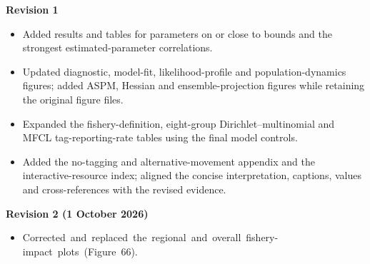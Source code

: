 \textbf{Revision 1}

\begin{itemize}
  \item Added results and tables for parameters on or close to bounds and the strongest estimated-parameter correlations.
  \item Updated diagnostic, model-fit, likelihood-profile and population-dynamics figures; added ASPM, Hessian and ensemble-projection figures while retaining the original figure files.
  \item Expanded the fishery-definition, eight-group Dirichlet--multinomial and MFCL tag-reporting-rate tables using the final model controls.
  \item Added the no-tagging and alternative-movement appendix and the interactive-resource index; aligned the concise interpretation, captions, values and cross-references with the revised evidence.
\end{itemize}

\bigskip
\textbf{Revision 2 (1 October 2026)}

\begin{itemize}
  \item \mbox{Corrected and replaced the regional and overall fishery-impact plots (Figure 66).}
\end{itemize}

\clearpage
